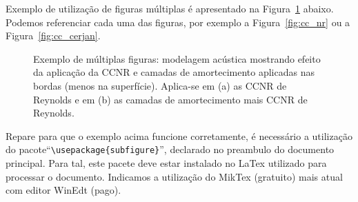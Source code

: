 Exemplo de utilização de figuras múltiplas é apresentado na Figura~\ref{fig:cc}
abaixo. Podemos referenciar cada uma das figuras, por exemplo a Figura~\ref{fig:cc_nr} ou
a Figura~\ref{fig:cc_cerjan}.
\begin{figure}[hbt]
\centering {} \qquad {}
\caption[Exemplo de múltiplas figuras (texto do índice).]{Exemplo de múltiplas
figuras: modelagem
acústica mostrando efeito da aplicação da CCNR e camadas de amortecimento
aplicadas nas bordas (menos na superfície). Aplica-se em (a) as CCNR de
Reynolds e em (b) as camadas de amortecimento mais CCNR de Reynolds.}
\label{fig:cc}
\end{figure}

Repare para que o exemplo acima funcione corretamente, é necessário a utilização do pacote``\verb|\usepackage{subfigure}|'', declarado no preambulo do documento principal. Para tal, este pacete deve estar instalado no LaTex utilizado para processar o documento. Indicamos a utilização do MikTex (gratuito) mais atual com editor WinEdt (pago).